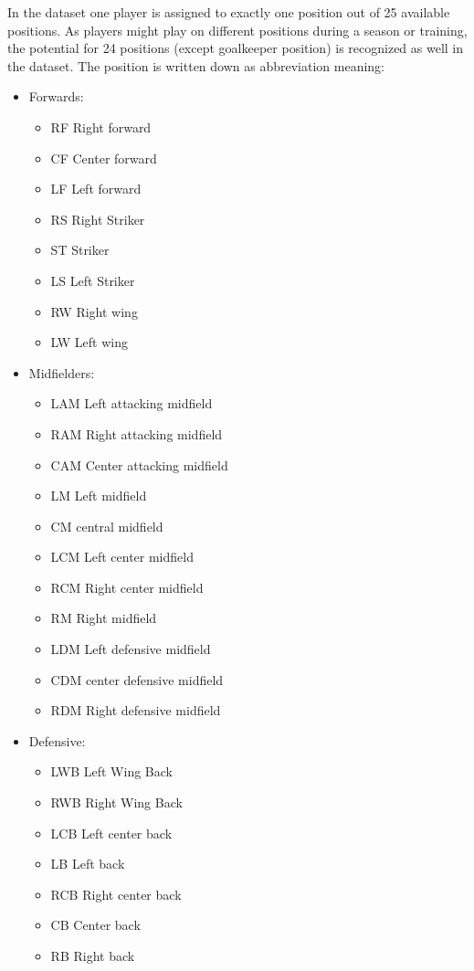 In the dataset one player is assigned to exactly one position out of 25 available positions. As players might play on different positions during a season or training, the potential for 24 positions (except goalkeeper position) is recognized as well in the dataset. The position is written down as abbreviation meaning:
\setlength{\columnseprule}{0.4pt}
\begin{multicols}{3}
\begin{itemize}
\item	Forwards:
\begin{itemize}
\item	RF Right forward
\item	CF Center forward
\item	LF Left forward
\item	RS Right Striker
\item	ST Striker
\item	LS Left Striker
\item	RW Right wing
\item	LW Left wing 
\end{itemize}
\item	Midfielders:
\begin{itemize}
\item	LAM Left attacking midfield
\item	RAM Right attacking midfield
\item	CAM Center attacking midfield
\item	LM Left midfield
\item	CM central midfield
\item	LCM Left center midfield
\item	RCM Right center midfield
\item	RM Right midfield
\item	LDM Left defensive midfield
\item	CDM center defensive midfield
\item	RDM Right defensive midfield
\columnbreak
\end{itemize}
\item	Defensive: 
\begin{itemize}
\item	LWB Left Wing Back
\item	RWB Right Wing Back
\item	LCB Left center back 
\item	LB Left back
\item	RCB Right center back
\item	CB Center back
\item	RB Right back
\end{itemize}
\end{itemize}
\end{multicols}
